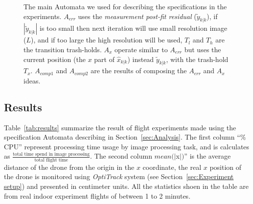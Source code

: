\documentclass{sig-alternate-ipsn13}
\begin{document}
\begin{figure}[htbp]
\begin{tabular}{c c}
        
    \end{tabular}
    
    \caption{The main Automata we used for describing the specifications in the experiments. 
        \newline $A_{err}$ uses the \textit{measurement post-fit residual} ($\tilde{y}_{k|k}$), if $|\tilde{y}_{k|k}|$ is too small then next iteration will use small resolution image ($L$), and if too large the high resolution will be used, $T_l$ and $T_h$ are the transition trash-holds.
        \newline $A_x$ operate similar to $A_{err}$ but uses the current position (the $x$ part of $\hat{x}_{k|k}$) instead $\tilde{y}_{k|k}$, with the trash-hold $T_x$.
        \newline $A_{comp1}$ and $A_{comp2}$ are the results of composing the $A_{err}$ and $A_x$ ideas.}
    
    \label{fig:test_automata}
\end{figure}


\subsection{Results}
\label{sec:results}

Table~\ref{tab:results} summarize the result of flight experiments made using the specification Automata describing in Section~\ref{sec:Analysis}.
The first column ``\% CPU'' represent processing time usage by image processing task, and is calculates as $\frac{\text{total time spend in image processing}}{\text{total flight time}}$.
The second column $mean(|$x$|)$'' is the average distance of the drone from the origin in the $x$ coordinate, the real $x$ position of the drone is monitored using \textit{OptiTrack} system (see Section~\ref{sec:Experiment setup}) and presented in centimeter units.
All the statistics shoen in the table are from real indoor experiment flights of between 1 to 2 minutes.













\end{document}
